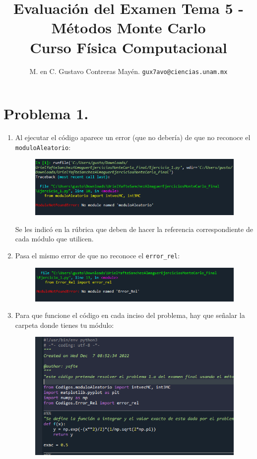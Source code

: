 

\author{M. en C. Gustavo Contreras Mayén. \texttt{gux7avo@ciencias.unam.mx}}
\title{Evaluación del Examen Tema 5 - Métodos Monte Carlo \\ {\large Curso Física Computacional}}
\date{ }


\maketitle
\fontsize{14}{14}\selectfont

\section{Problema 1.}
\begin{enumerate}
\item Al ejecutar el código aparece un error (que no debería) de que no reconoce el \texttt{moduloAleatorio}:
\begin{figure}[H]
    \centering
    \includegraphics[scale=0.8]{Evidencia_01a.png}
\end{figure}
Se les indicó en la rúbrica que deben de hacer la referencia correspondiente de cada módulo que utilicen.
\item Pasa el mismo error de que no reconoce el \texttt{error\_rel}:
\begin{figure}[H]
    \centering
    \includegraphics[scale=0.8]{Evidencia_01b.png}
\end{figure}
\item Para que funcione el código en cada inciso del problema, hay que señalar la carpeta donde tienes tu módulo:
\begin{figure}[H]
    \centering
    \includegraphics[scale=0.8]{Evidencia_01c.png}

\end{figure}
\end{enumerate}
